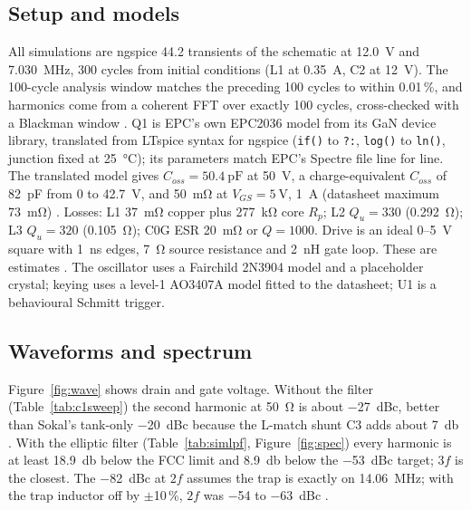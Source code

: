 \documentclass[11pt,letterpaper]{article}
\begin{document}
\subsection{Setup and models}
All simulations are ngspice 44.2 transients of the schematic at \SI{12.0}{\volt} and \SI{7.030}{\mega\hertz}, 300 cycles from initial conditions (L1 at \SI{0.35}{\ampere}, C2 at \SI{12}{\volt}). The 100-cycle analysis window matches the preceding 100 cycles to within 0.01\,\%, and harmonics come from a coherent FFT over exactly 100 cycles, cross-checked with a Blackman window \cite{projsim,projnotes}. Q1 is EPC's own EPC2036 model from its GaN device library, translated from LTspice syntax for ngspice (\texttt{if()} to \texttt{?:}, \texttt{log()} to \texttt{ln()}, junction fixed at \SI{25}{\celsius}); its parameters match EPC's Spectre file line for line. The translated model gives $C_{oss}=\SI{50.4}{\pico\farad}$ at \SI{50}{\volt}, a charge-equivalent $C_{oss}$ of \SI{82}{\pico\farad} from 0 to \SI{42.7}{\volt}, and \SI{50}{\milli\ohm} at $V_{GS}=\SI{5}{\volt}$, \SI{1}{\ampere} (datasheet maximum \SI{73}{\milli\ohm}) \cite{projnotes,epc2036ds}. Losses: L1 \SI{37}{\milli\ohm} copper plus \SI{277}{\kilo\ohm} core $R_p$; L2 $Q_u=330$ (\SI{0.292}{\ohm}); L3 $Q_u=320$ (\SI{0.105}{\ohm}); C0G ESR \SI{20}{\milli\ohm} or $Q=1000$. Drive is an ideal 0--\SI{5}{\volt} square with \SI{1}{\nano\second} edges, \SI{7}{\ohm} source resistance and \SI{2}{\nano\henry} gate loop. These are estimates \cite{projnotes}. The oscillator uses a Fairchild 2N3904 model and a placeholder crystal; keying uses a level-1 AO3407A model fitted to the datasheet; U1 is a behavioural Schmitt trigger.

\subsection{Waveforms and spectrum}
Figure~\ref{fig:wave} shows drain and gate voltage. Without the filter (Table~\ref{tab:c1sweep}) the second harmonic at \SI{50}{\ohm} is about \SI{-27}{dBc}, better than Sokal's tank-only \SI{-20}{dBc} because the L-match shunt C3 adds about \SI{7}{\decibel} \cite{projnotes}. With the elliptic filter (Table~\ref{tab:simlpf}, Figure~\ref{fig:spec}) every harmonic is at least \SI{18.9}{\decibel} below the FCC limit and \SI{8.9}{\decibel} below the \SI{-53}{dBc} target; $3f$ is the closest. The \SI{-82}{dBc} at $2f$ assumes the trap is exactly on \SI{14.06}{\mega\hertz}; with the trap inductor off by $\pm$10\,\%, $2f$ was \SI{-54}{} to \SI{-63}{dBc} \cite{projsim}.
\end{document}
